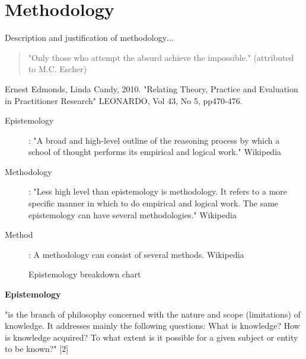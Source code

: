 
\chapter{Methodology}
\label{ch:method}

\begin{shaded}
  Description and justification of methodology$\ldots$
\end{shaded}

\begin{quote}
  "Only those who attempt the absurd achieve the impossible." (attributed to M.C. Escher)
\end{quote}

Ernest Edmonds, Linda Candy, 2010. "Relating Theory, Practice and Evaluation in Practitioner Research" LEONARDO, Vol 43, No 5, pp470-476.

\begin{description}
  \item [Epistemology]:	"A broad and high-level outline of the reasoning process by which a school of thought performs its empirical and logical work." Wikipedia
  \item [Methodology]: "Less high level than epistemology is methodology. It refers to a more specific manner in which to do empirical and logical work. The same epistemology can have several methodologies." Wikipedia
  \item [Method]:	A methodology can consist of several methods. Wikipedia
\end{description}

\begin{figure}[htb]
  \centering
  \caption[Epistemology]{Epistemology breakdown chart}
  \label{fig:method}
\end{figure}

\textbf{Epistemology}

"is the branch of philosophy concerned with the nature and scope (limitations) of knowledge. It addresses mainly the following questions: What is knowledge? How is knowledge acquired? To what extent is it possible for a given subject or entity to be known?" [2]

